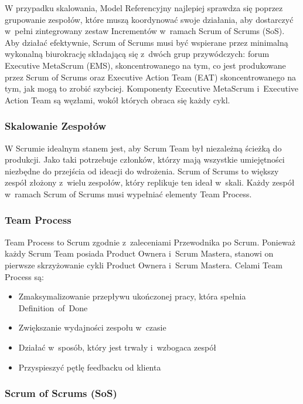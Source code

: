 \documentclass[12pt,a4paper,parskip=full]{scrartcl}
\begin{document}
W przypadku skalowania, Model Referencyjny najlepiej sprawdza się poprzez grupowanie zespołów, które muszą koordynować swoje działania, aby dostarczyć w~pełni zintegrowany zestaw Incrementów w~ramach Scrum of Scrums (SoS). Aby działać efektywnie, Scrum of Scrums musi być wspierane przez minimalną wykonalną biurokrację składającą się z~dwóch grup przywódczych: forum Executive MetaScrum (EMS), skoncentrowanego na tym, co jest produkowane przez Scrum of Scrums oraz Executive Action Team (EAT) skoncentrowanego na tym, jak mogą to zrobić szybciej. Komponenty Executive MetaScrum i~Executive Action Team są węzłami, wokół których obraca się każdy cykl.

\subsubsection{Skalowanie Zespołów}\label{scaling-the-teams}

W Scrumie idealnym stanem jest, aby Scrum Team był niezależną ścieżką do produkcji. Jako taki potrzebuje członków, którzy mają wszystkie umiejętności niezbędne do przejścia od ideacji do wdrożenia. Scrum of Scrums to większy zespół złożony z~wielu zespołów, który replikuje ten ideał w~skali. Każdy zespół w~ramach Scrum of Scrums musi wypełniać elementy Team Process.

\subsubsection{Team Process}\label{the-team-process}

Team Process to Scrum zgodnie z~zaleceniami Przewodnika po Scrum. Ponieważ każdy Scrum Team posiada Product Ownera i~Scrum Mastera, stanowi on pierwsze skrzyżowanie cykli Product Ownera i~Scrum Mastera. Celami Team Process są:
\begin{itemize}
\itemsep1pt\parskip0pt
\item
 Zmaksymalizowanie przepływu ukończonej pracy, która spełnia Definition\ of\ Done
\item
  Zwiększanie wydajności zespołu w~czasie
\item
  Działać w~sposób, który jest trwały i~wzbogaca zespół
\item
  Przyspieszyć pętlę feedbacku od klienta
\end{itemize}

\subsubsection{Scrum of Scrums (SoS)}\label{the-scrum-of-scrums}
\end{document}
